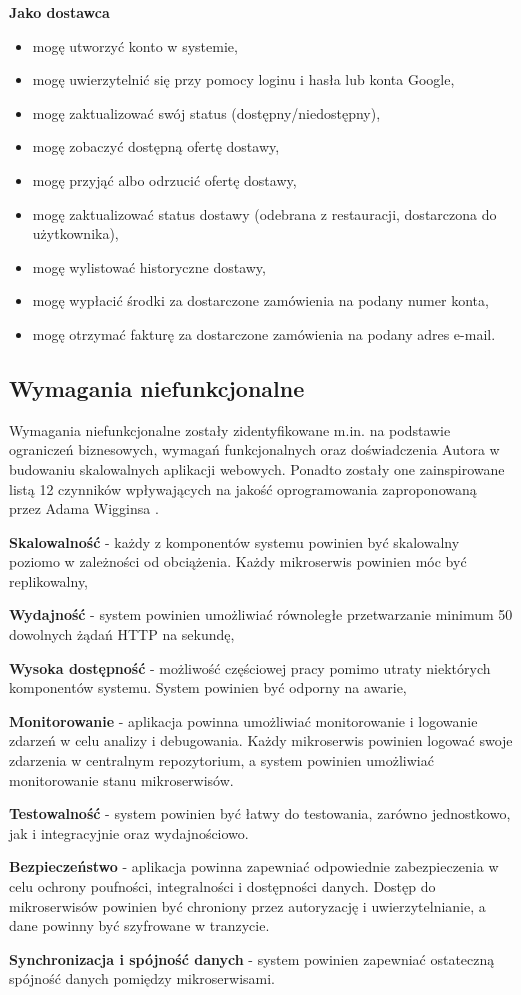 \medskip

\textbf{Jako dostawca}
\begin{itemize}
    \item mogę utworzyć konto w systemie,
    \item mogę uwierzytelnić się przy pomocy loginu i hasła lub konta Google,
    \item mogę zaktualizować swój status (dostępny/niedostępny),
    \item mogę zobaczyć dostępną ofertę dostawy,
    \item mogę przyjąć albo odrzucić ofertę dostawy,
    \item mogę zaktualizować status dostawy (odebrana z restauracji, dostarczona do użytkownika),
    \item mogę wylistować historyczne dostawy,
    \item mogę wypłacić środki za dostarczone zamówienia na podany numer konta,
    \item mogę otrzymać fakturę za dostarczone zamówienia na podany adres e-mail.
\end{itemize}

\subsection{Wymagania niefunkcjonalne}

Wymagania niefunkcjonalne zostały zidentyfikowane m.in. na podstawie ograniczeń biznesowych, wymagań funkcjonalnych oraz doświadczenia Autora w budowaniu skalowalnych aplikacji webowych. Ponadto zostały one zainspirowane listą 12 czynników wpływających na jakość oprogramowania zaproponowaną przez Adama Wigginsa \cite{12factors}.

\textbf{Skalowalność} - każdy z komponentów systemu powinien być skalowalny poziomo w zależności od obciążenia. Każdy mikroserwis powinien móc być replikowalny,

\textbf{Wydajność} - system powinien umożliwiać równoległe przetwarzanie minimum 50 dowolnych żądań HTTP na sekundę,

\textbf{Wysoka dostępność} - możliwość częściowej pracy pomimo utraty niektórych komponentów systemu. System powinien być odporny na awarie,

\textbf{Monitorowanie} - aplikacja powinna umożliwiać monitorowanie i logowanie zdarzeń w celu analizy i debugowania. Każdy mikroserwis powinien logować swoje zdarzenia w centralnym repozytorium, a system powinien umożliwiać monitorowanie stanu mikroserwisów.

\textbf{Testowalność} - system powinien być łatwy do testowania, zarówno jednostkowo, jak i integracyjnie oraz wydajnościowo.

\textbf{Bezpieczeństwo} - aplikacja powinna zapewniać odpowiednie zabezpieczenia w celu ochrony poufności, integralności i dostępności danych. Dostęp do mikroserwisów powinien być chroniony przez autoryzację i uwierzytelnianie, a dane powinny być szyfrowane w tranzycie.

\textbf{Synchronizacja i spójność danych} - system powinien zapewniać ostateczną spójność danych pomiędzy mikroserwisami.